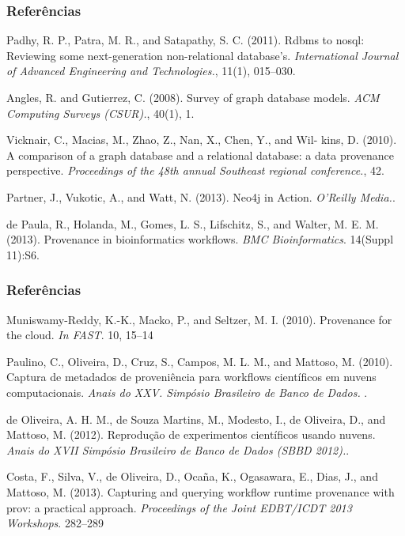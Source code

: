 \documentclass{beamer}
\begin{document}
\begin{frame}
\frametitle{Refer\^encias}
\footnotesize{
\begin{thebibliography}{99} %

 Padhy, R. P., Patra, M. R., and Satapathy,
  S. C. (2011).
\newblock Rdbms to nosql: Reviewing some next-generation non-relational database’s.
\newblock \emph{International Journal of Advanced Engineering and
  Technologies.}, 11(1), 015--030.

 Angles, R. and Gutierrez, C. (2008).
\newblock Survey of graph database models.
\newblock \emph{ACM Computing Surveys (CSUR).}, 40(1), 1.

 Vicknair, C., Macias, M., Zhao, Z., Nan, X., Chen, Y., and Wil- kins, D. (2010).
\newblock A comparison of a graph database and a relational database: a data provenance perspective.
\newblock \emph{Proceedings of the 48th annual Southeast regional conference.}, 42.

 Partner, J., Vukotic, A., and Watt, N. (2013).
\newblock Neo4j in Action.
\newblock \emph{O’Reilly Media.}.

 de Paula, R., Holanda, M., Gomes,
  L. S., Lifschitz, S., and Walter, M. E. M. (2013).
\newblock Provenance in bioinformatics workflows.
\newblock \emph{BMC Bioinformatics}. 14(Suppl 11):S6.
\end{thebibliography}
}
\end{frame}

\begin{frame}
\frametitle{Refer\^encias}
\footnotesize{
\begin{thebibliography}{99} %

 Muniswamy-Reddy, K.-K., Macko, P., and Seltzer, M. I. (2010).
\newblock Provenance for the cloud.
\newblock \emph{In FAST}. 10, 15--14

  Paulino, C., Oliveira, D., Cruz,
  S., Campos, M. L. M., and Mattoso, M. (2010).
\newblock Captura de metadados de proveni\^encia
para workflows cient\'ificos em nuvens computacionais.
\newblock \emph{Anais do XXV. Simpósio Brasileiro de Banco de Dados. }.

  de Oliveira, A. H. M., de
  Souza Martins, M., Modesto, I., de Oliveira, D., and Mattoso, M. (2012).
\newblock Reprodu\c{c}\~ao de experimentos cient\'ificos usando nuvens.
\newblock \emph{Anais do XVII Simpósio Brasileiro de Banco de Dados (SBBD 2012).}.

  Costa, F., Silva, V., de Oliveira, D., Oca\~na, K., Ogasawara, E., Dias, J., and Mattoso, M. (2013).
\newblock Capturing and querying workflow runtime provenance with prov: a practical approach.
\newblock \emph{Proceedings of the Joint EDBT/ICDT 2013 Workshops}. 282--289
\end{thebibliography}
}
\end{frame}
\end{document}

